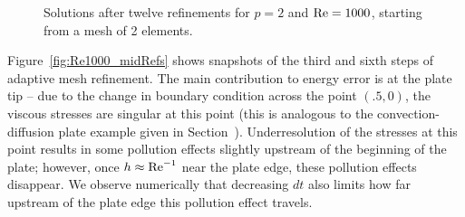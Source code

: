 \begin{figure}
\centering
{}
\caption{Solutions after twelve refinements for $p=2$ and $\Reyn = 1000$, starting from a mesh of 2 elements.}
\label{fig:Re1000}
\end{figure}

Figure~\ref{fig:Re1000_midRefs} shows snapshots of the third and sixth steps of adaptive mesh refinement.  The main contribution to energy error is at the plate tip -- due to the change in boundary condition across the point $(.5,0)$, the viscous stresses are singular at this point (this is analogous to the convection-diffusion plate example given in Section~).  Underresolution of the stresses at this point results in some pollution effects slightly upstream of the beginning of the plate; however, once $h\approx {\rm Re}^{-1}$ near the plate edge, these pollution effects disappear.  We observe numerically that decreasing $dt$ also limits how far upstream of the plate edge this pollution effect travels.

